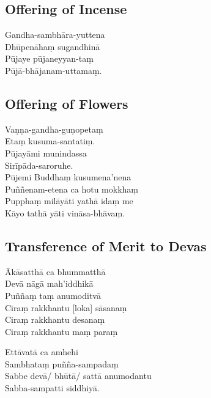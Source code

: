 \clearpage

\subsection{Offering of Incense}


\begin{paritta}
Gandha-sambhāra-yuttena\\
Dhūpenāhaṃ sugandhinā\\
Pūjaye pūjaneyyan-taṃ\\
Pūjā-bhājanam-uttamaṃ.
\end{paritta}

\subsection{Offering of Flowers}


\begin{paritta}
Vaṇṇa-gandha-guṇopetaṃ\\
Etaṃ kusuma-santatiṃ.\\
Pūjayāmi munindassa\\
Sirīpāda-saroruhe.\\
Pūjemi Buddhaṃ kusumena'nena\\
Puññenam-etena ca hotu mokkhaṃ\\
Pupphaṃ milāyāti yathā idaṃ me\\
Kāyo tathā yāti vināsa-bhāvaṃ.
\end{paritta}

\subsection{Transference of Merit to Devas}


\begin{paritta}
Ākāsatthā ca bhummatthā\\
Devā nāgā mah'iddhikā\\
Puññaṃ taṃ anumoditvā\\
Ciraṃ rakkhantu [loka] sāsanaṃ\\
Ciraṃ rakkhantu desanaṃ\\
Ciraṃ rakkhantu maṃ paraṃ
\end{paritta}

\begin{paritta}
Ettāvatā ca amhehi\\
Sambhataṃ puñña-sampadaṃ\\
Sabbe devā/ bhūtā/ sattā anumodantu\\
Sabba-sampatti siddhiyā.
\end{paritta}

